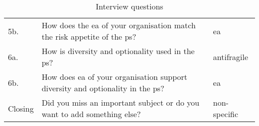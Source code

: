 \begin{table}[!h]
\begin{center}
\begin{tabular}{@{}p{}p{}p{}@{}}
				5b. & How does the \acrshort{ea} of your organisation match the risk appetite of the \gls{ps}?
				  & \acrshort{ea} \\%
				6a. & How is \gls{diversity} and \gls{optionality} used in the \gls{ps}? & \Gls{antifragile} \\%
				6b. & How does \acrshort{ea} of your organisation support \gls{diversity} and \gls{optionality} in the \gls{ps}? & \acrshort{ea} \\%
				Closing & Did you miss an important subject or do you want to add something else? & non-specific \\%
				\bottomrule
			\end{tabular}
		\caption{Interview questions}
	\end{center}
\end{table}
